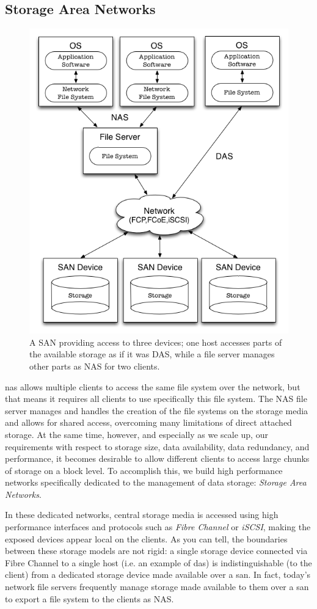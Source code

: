 \subsection{Storage Area Networks}
\label{file systems:storage-models:san}

\begin{figure}[ht]
	\centering
	\includegraphics[width=.66\textwidth]{04/pics/san-nas-das}
		\caption[SAN illustrated]{A SAN providing access to three devices;
			one host accesses parts of the available storage
			as if it was DAS, while a file server manages
			other parts as NAS for two clients.
			\label{fig:storage:san}}
\end{figure}

\gls{nas} allows multiple clients to access the same file
system over the network, but that means it requires
all clients to use specifically this file system.  The
NAS file server manages and handles the creation of
the file systems on the storage media and allows for
shared access, overcoming many limitations of direct
attached storage.  At the same time, however, and
especially as we scale up, our requirements with
respect to storage size, data availability, data
redundancy, and performance, it becomes desirable to
allow different clients to access large chunks of
storage on a block level.  To accomplish this, we
build high performance networks specifically dedicated
to the management of data storage: {\em Storage Area
Networks}.

In these dedicated networks, central storage media is
accessed using high performance interfaces and
protocols such as {\em Fibre Channel} or {\em iSCSI}, making the
exposed devices appear local on the clients.  As you
can tell, the boundaries between these storage models
are not rigid: a single storage device connected via
Fibre Channel to a single host (i.e.  an example of
\gls{das}) is indistinguishable (to the client) from a
dedicated storage device made available over a
\gls{san}.  In fact, today's network file servers
frequently manage storage made available to them over
a \gls{san} to export a file system to the clients as NAS.

